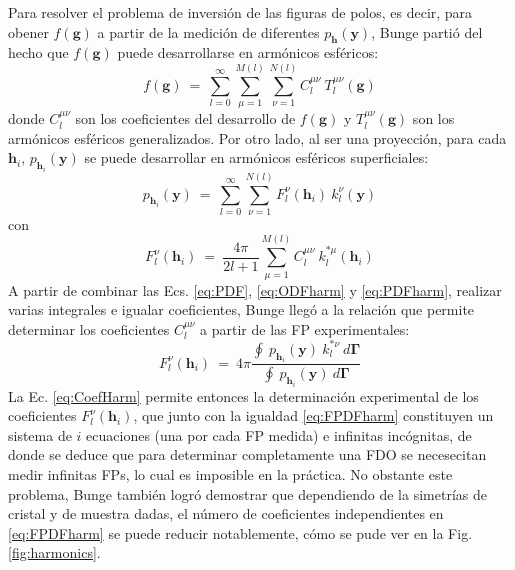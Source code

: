 Para resolver el problema de inversión de las figuras de polos, es decir, para obener $f(\mathbf{g})$ a partir de la medición de diferentes $p_{\mathbf{h}}(\mathbf{y})$, Bunge partió del hecho que $f(\mathbf{g})$ puede desarrollarse en armónicos esféricos:
\begin{equation}
  f(\mathbf{g}) \ = \ \sum_{l=0}^{\infty} \sum_{\mu=1}^{M(l)} \sum_{\nu=1}^{N(l)} C_{l}^{\mu \nu} \ T_{l}^{\mu \nu}(\mathbf{g})
  \label{eq:ODFharm}
\end{equation}
\noindent
donde $C_{l}^{\mu \nu}$ son los coeficientes del desarrollo de $f(\mathbf{g})$ y $T_{l}^{\mu \nu}(\mathbf{g})$ son los armónicos esféricos generalizados.
Por otro lado, al ser una proyección, para cada $\mathbf{h}_i$, $p_{\mathbf{h}_i}(\mathbf{y})$ se puede desarrollar en armónicos esféricos superficiales:
\begin{equation}
  p_{\mathbf{h}_i}(\mathbf{y}) \ = \ \sum_{l=0}^{\infty} \sum_{\nu=1}^{N(l)} F_{l}^{\nu}(\mathbf{h}_i) \ k_{l}^{\nu}(\mathbf{y})
  \label{eq:PDFharm}
\end{equation}
\noindent
con
\begin{equation}
  F_{l}^{\nu}(\mathbf{h}_i) \ = \ \frac{4 \pi}{2l + 1} \sum_{\mu=1}^{M(l)} C_{l}^{\mu \nu} \ k_{l}^{* \mu}(\mathbf{h}_i)
  \label{eq:FPDFharm}
\end{equation}
\noindent
A partir de combinar las Ecs. \ref{eq:PDF}, \ref{eq:ODFharm} y \ref{eq:PDFharm}, realizar varias integrales e igualar coeficientes, Bunge llegó a la relación que permite determinar los coeficientes $C_{l}^{\mu \nu}$ a partir de las FP experimentales\cite{bunge2013texture}:
\begin{equation}
  F_{l}^{\nu}(\mathbf{h}_i) \ = \ 4 \pi \frac{\oint \ p_{\mathbf{h}_i}(\mathbf{y}) \ k_{l}^{* \nu} \ d\mathbf{\Gamma}}{\oint \ p_{\mathbf{h}_i}(\mathbf{y}) \ d\mathbf{\Gamma}}
  \label{eq:CoefHarm}
\end{equation}
\noindent
La Ec. \ref{eq:CoefHarm} permite entonces la determinación experimental de los coeficientes $F_{l}^{\nu}(\mathbf{h}_i)$, que junto con la igualdad \ref{eq:FPDFharm} constituyen un sistema de $i$ ecuaciones (una por cada FP medida) e infinitas incógnitas, de donde se deduce que para determinar completamente una FDO se necesecitan medir infinitas FPs, lo cual es imposible en la práctica.
No obstante este problema, Bunge\cite{bunge2013texture} también logró demostrar que dependiendo de la simetrías de cristal y de muestra dadas, el número de coeficientes independientes en \ref{eq:FPDFharm} se puede reducir notablemente, cómo se pude ver en la Fig. \ref{fig:harmonics}.
